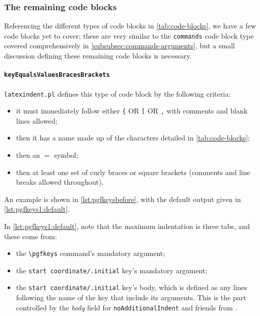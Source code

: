 \subsubsection{The remaining code blocks}
	Referencing the different types of code blocks in \vref{tab:code-blocks}, we have a few
	code blocks yet to cover; these are very similar to the \texttt{commands} code block type
	covered comprehensively in \vref{subsubsec:commands-arguments}, but a small discussion
	defining these remaining code blocks is necessary.

	\paragraph{\texttt{keyEqualsValuesBracesBrackets}}
		\texttt{latexindent.pl} defines this type of code block by the following criteria:
		\begin{itemize}
			\item it must immediately follow either \lstinline!{! OR \lstinline![! OR \lstinline!,! with comments
			      and blank lines allowed;
			\item then it has a name made up of the characters detailed in \vref{tab:code-blocks};
			\item then an $=$ symbol;
			\item then at least one set of curly braces or square brackets (comments and line breaks allowed throughout).
		\end{itemize}

		An example is shown in \cref{lst:pgfkeysbefore}, with the default output given in \cref{lst:pgfkeys1:default}.

		\begin{minipage}{.45\textwidth}
		\end{minipage}%
		\hfill
		\begin{minipage}{.5\textwidth}
		\end{minipage}%

		In \cref{lst:pgfkeys1:default}, note that the maximum indentation is three tabs, and these come from:
		\begin{itemize}
			\item the \lstinline!\pgfkeys! command's mandatory argument;
			\item the \lstinline!start coordinate/.initial! key's mandatory argument;
			\item the \lstinline!start coordinate/.initial! key's body, which is defined as any lines following the name of the
			      key that include its arguments.  This is the part controlled by the \emph{body} field for \texttt{noAdditionalIndent}
			      and friends from .
		\end{itemize}
